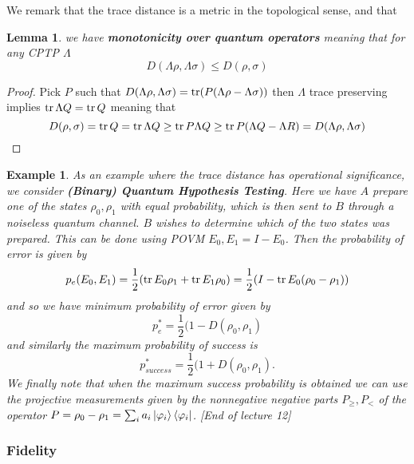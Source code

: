 \documentclass{article}
\newtheorem{lemma}{Lemma}
\newtheorem{example}{Example}
\theoremstyle{definition}
\begin{document}
We remark that the trace distance is a metric in the topological sense, and that
\begin{lemma}
  we have \textbf{monotonicity over quantum operators} meaning that for any 
  CPTP $\Lambda$ 
  \begin{equation}
    D(\Lambda\rho, \Lambda\sigma) \leq D(\rho, \sigma)
  \end{equation}
\end{lemma}
\begin{proof}
  Pick $P$ such that $D(\Lambda \rho, \Lambda \sigma) = \tr(P (\Lambda \rho -
  \Lambda \sigma))$ then $\Lambda$ trace preserving implies $\tr \Lambda Q = 
  \tr Q$ meaning that 
  $$ 
  D(\rho, \sigma) = \tr Q = \tr \Lambda Q \geq \tr P\Lambda Q \geq 
  \tr P(\Lambda Q - \Lambda R) = D(\Lambda \rho, \Lambda \sigma) 
  $$
\end{proof}

\begin{example}
  As an example where the trace distance has operational significance, we
  consider \textbf{(Binary) Quantum Hypothesis Testing}. Here we have $A$ 
  prepare one of the states $\rho_0, \rho_1$ with equal probability, which
  is then sent to $B$ through a noiseless quantum channel. $B$ wishes to 
  determine which of the two states was prepared. This can be done using POVM
  $E_0, E_1 = I - E_0$. Then the probability of error is given by
  \begin{equation}
    p_e(E_0, E_1) = \frac{1}{2}(\tr E_0 \rho_1 + \tr E_1 \rho_0) = 
    \frac{1}{2} (I - \tr E_0 (\rho_0 - \rho_1))
  \end{equation}
  and so we have minimum probability of error given by
  \begin{equation}
    p_e^* = \frac{1}{2} (1 - D(\rho_0, \rho_1)
  \end{equation}
  and similarly the maximum probability of success is
  \begin{equation}
    p_{success}^* = \frac{1}{2} (1 + D(\rho_0, \rho_1).
  \end{equation}
  We finally note that when the maximum success probability is obtained we can
  use the projective measurements given by the nonnegative negative parts 
  $P_\geq, P_<$ of the operator $P = \rho_0 - \rho_1 = \sum_i a_i 
  \ket{\varphi_i} \bra{\varphi_i}$. [End of lecture 12]
\end{example}

\subsubsection{Fidelity}
\end{document}
